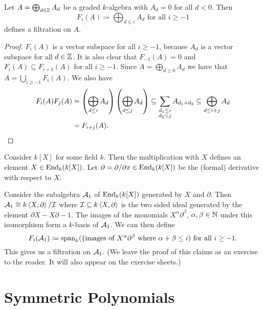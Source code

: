 \begin{lem}
  Let $A = \bigoplus_{d \in \mathbb{Z}} A_d$ be a graded $k$-algebra with $A_d = 0$ for all $d < 0$.
  Then
  \[
              F_i(A)
    \coloneqq \bigoplus_{d \leq i} A_d
    \text{ for all }
    i \geq -1
  \]
  defines a filtration on $A$.
\end{lem}
\begin{proof}
  $F_i(A)$ is a vector subspace for all $i \geq -1$, because $A_d$ is a vector subspace for all $d \in \mathbb{Z}$.
  It is also clear that $F_{-1}(A) = 0$ and $F_i(A) \subseteq F_{i+1}(A)$ for all $i \geq -1$.
  Since $A = \bigoplus_{d \geq 0} A_d$ we have that $A = \bigcup_{i \geq -1} F_i(A)$.
  We also have
  \begin{align*}
              F_i(A) F_j(A)
    &=        \left( \bigoplus_{d \leq i} A_d \right) \left( \bigoplus_{d \leq j} A_d \right)
    \subseteq \sum_{\substack{d_1 \leq i \\ d_2 \leq j}} A_{d_1 + d_2}
    \subseteq \bigoplus_{d \leq i+j} A_d \\
    &=        F_{i+j}(A).
    \qedhere
  \end{align*}
\end{proof}


\begin{expl}
  Consider $k[X]$ for some field $k$.
  Then the multiplication with $X$ defines an element $X \in \operatorname{End}_k(k[X])$.
  Let $\partial = \partial/\partial x \in \operatorname{End}_k(k[X])$ be the (formal) derivative with respect to $X$.
  
  Consider the subalgebra $\mathcal{A}_1$ of $\operatorname{End}_k(k[X])$ generated by $X$ and $\partial$.
  Then $\mathcal{A}_1 \cong k\left\langle X,\partial \right\rangle/\mathcal{I}$ where $\mathcal{I} \subseteq k \left\langle X,\partial \right\rangle$ is the two sided ideal generated by the element $\partial X - X \partial - 1$.
  The images of the monomials $X^\alpha \partial^\beta$, $\alpha, \beta \in \mathbb{N}$ under this isomorphism form a $k$-basis of $\mathcal{A}_1$.
  We can then define
  \[
              F_i(\mathcal{A}_1)
    \coloneqq \operatorname{span}_k( \{\text{images of $X^\alpha \partial^\beta$ where $\alpha+\beta \leq i$})
    \text{ for all }
    i \geq -1.
  \]
  This gives us a filtration on $\mathcal{A}_1$.
  (We leave the proof of this claims as an exercise to the reader. It will also appear on the exercise sheets.)
\end{expl}





\section{Symmetric Polynomials}



